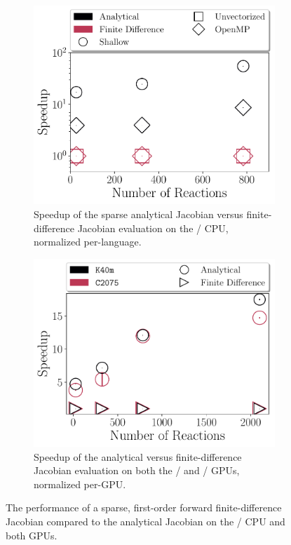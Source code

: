 \documentclass[12pt,number,sort&compress,preprint]{elsarticle}
\begin{document}
\begin{figure}[htbp]
   \centering
  \begin{subfigure}[t]{0.48\linewidth}
      \includegraphics[width=\textwidth]{finite_difference_vs_analytical.pdf}
      \caption{Speedup of the sparse analytical Jacobian versus finite-difference Jacobian evaluation on the \avx/ CPU, normalized per-language.}
      \label{F:fd_vs_analytical_cpu}
  \end{subfigure}
  \hfill
  \begin{subfigure}[t]{0.48\linewidth}
      \includegraphics[width=\textwidth]{finite_difference_vs_analytical_gpu.pdf}
      \caption{Speedup of the analytical versus finite-difference Jacobian evaluation on both the \gpunew/ and \gpuold/ GPUs, normalized per-GPU.}
      \label{F:fd_vs_analytical_gpu}
  \end{subfigure}
  \caption{The performance of a sparse, first-order forward finite-difference Jacobian compared to the analytical Jacobian on the \avx/ CPU and both GPUs.}
  \label{F:fd_vs_analytical}
\end{figure}
\end{document}
